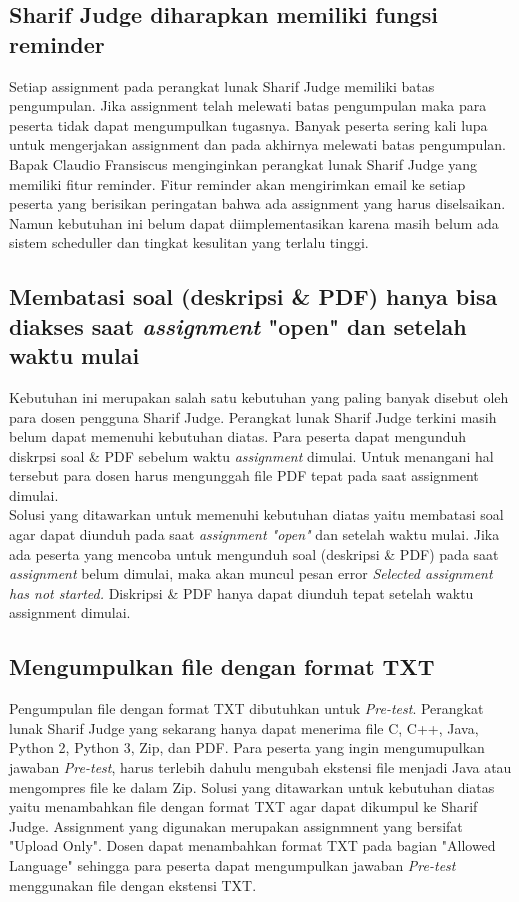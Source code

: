 \subsection{Sharif Judge diharapkan memiliki fungsi reminder}
Setiap assignment pada perangkat lunak Sharif Judge memiliki batas pengumpulan. Jika assignment telah melewati batas pengumpulan maka para peserta tidak dapat mengumpulkan tugasnya. Banyak peserta sering kali lupa untuk mengerjakan assignment dan pada akhirnya melewati batas pengumpulan. Bapak Claudio Fransiscus menginginkan perangkat lunak Sharif Judge yang memiliki fitur reminder. Fitur reminder akan mengirimkan email ke setiap peserta yang berisikan peringatan bahwa ada assignment yang harus diselsaikan. Namun kebutuhan ini belum dapat diimplementasikan karena masih belum ada sistem scheduller dan tingkat kesulitan yang terlalu tinggi.

\subsection{Membatasi soal (deskripsi \& PDF) hanya bisa diakses saat \textit{assignment} "open" dan setelah waktu mulai}
Kebutuhan ini merupakan salah satu kebutuhan yang paling banyak disebut oleh para dosen pengguna Sharif Judge. Perangkat lunak Sharif Judge terkini masih belum dapat memenuhi kebutuhan diatas. Para peserta dapat mengunduh diskrpsi soal \& PDF sebelum waktu \textit{assignment} dimulai. Untuk menangani hal tersebut para dosen harus mengunggah file PDF tepat pada saat assignment dimulai. \\
Solusi yang ditawarkan untuk memenuhi kebutuhan diatas yaitu membatasi soal agar dapat diunduh pada saat \textit{assignment "open"} dan setelah waktu mulai. Jika ada peserta yang mencoba untuk mengunduh soal (deskripsi \& PDF) pada saat \textit{assignment} belum dimulai, maka akan muncul pesan error \textit{Selected \textit{assignment} has not started.} Diskripsi \& PDF hanya dapat diunduh tepat setelah waktu assignment dimulai.

\subsection{Mengumpulkan file dengan format TXT}
Pengumpulan file dengan format TXT dibutuhkan untuk \textit{Pre-test}. Perangkat lunak Sharif Judge yang sekarang hanya dapat menerima file C, C++, Java, Python 2, Python 3, Zip, dan PDF. Para peserta yang ingin mengumupulkan jawaban \textit{Pre-test}, harus terlebih dahulu mengubah ekstensi file menjadi Java atau mengompres file ke dalam Zip.
Solusi yang ditawarkan untuk kebutuhan diatas yaitu menambahkan file dengan format TXT agar dapat dikumpul ke Sharif Judge. Assignment yang digunakan merupakan assignmnent yang bersifat "Upload Only". Dosen dapat menambahkan format TXT pada bagian "Allowed Language" sehingga para peserta dapat mengumpulkan jawaban \textit{Pre-test} menggunakan file dengan ekstensi TXT.

